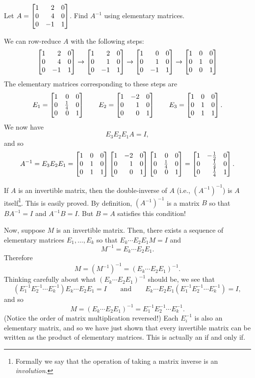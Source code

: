 \begin{example}
	Let $A=\mat{1&2&0\\0&4&0\\0&-1&1}$. Find $A^{-1}$ using elementary matrices.

	We can row-reduce $A$ with the following steps:
	\[
	    \mat{1&2&0\\0&4&0\\0&-1&1}\to \mat{1&2&0\\0&1&0\\0&-1&1}\to \mat{1&0&0\\0&1&0\\0&-1&1}\to \mat{1&0&0\\0&1&0\\0&0&1} 
	\]
	The elementary matrices corresponding to these steps are
	\[
	    E_1=\mat{1&0&0\\0&\frac{1}{4}&0\\0&0&1} \qquad E_2=\mat{1&-2&0\\0&1&0\\0&0&1}\qquad E_3=\mat{1&0&0\\0&1&0\\0&1&1}.
	\]
	We now have 
	\[
	    E_3 E_2 E_1 A = I,
	\]
	and so
	\[
	    A^{-1}=E_3 E_2 E_1 = \mat{1&0&0\\0&1&0\\0&1&1}\mat{1&-2&0\\0&1&0\\0&0&1}\mat{1&0&0\\0&\frac{1}{4}&0\\0&0&1} = \mat{1&-\frac{1}{2}&0\\ 0&\frac{1}{4}&0\\ 0&\frac{1}{4}&1}.
	\]
\end{example}


If $A$ is an invertible matrix, then the double-inverse of $A$ (i.e., $(A^{-1})^{-1}$) is $A$ itself\footnote{ Formally
we say that the operation of taking a matrix inverse is an \emph{involution}.}. This is easily proved. By definition, $(A^{-1})^{-1}$
is a matrix $B$ so that $BA^{-1}=I$ and $A^{-1}B=I$. But $B=A$ satisfies this condition! 

Now, suppose $M$ is an invertible matrix. Then, there exists a sequence of elementary matrices $E_1,\ldots, E_k$ so that
$E_k\cdots E_2E_1M=I$ and 
\[
	M^{-1}=E_k\cdots E_2E_1.
\]
Therefore 
\[
	M=(M^{-1})^{-1} = (E_k\cdots E_2E_1)^{-1}.
\]
Thinking carefully about what $(E_k\cdots E_2E_1)^{-1}$ should be, we see that 
\[
	(E_1^{-1}E_2^{-1}\cdots E_k^{-1})E_k\cdots E_2E_1=I\qquad\text{and}\qquad E_k\cdots E_2E_1(E_1^{-1}E_2^{-1}\cdots E_k^{-1})=I,
\]
and so
\[
	M=(E_k\cdots E_2E_1)^{-1}=E_1^{-1}E_2^{-1}\cdots E_k^{-1}.
\]
(Notice the order of matrix multiplication reversed!)
Each $E_i^{-1}$ is also an elementary matrix, and so we have just shown that every invertible matrix can
be written as the product of elementary matrices. This is actually an if and only if.

